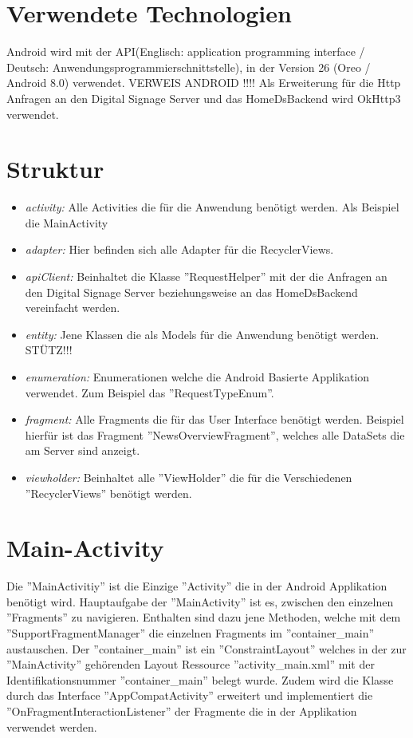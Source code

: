 \section{Verwendete Technologien}
Android wird mit der API(Englisch: application programming interface / Deutsch: Anwendungsprogrammierschnittstelle), in der Version 26 (Oreo / Android 8.0) verwendet. 
VERWEIS ANDROID !!!!
Als Erweiterung für die Http Anfragen an den Digital Signage Server und das HomeDsBackend wird OkHttp3 verwendet.

\section{Struktur}
\begin{itemize}
	\item {\em activity:} Alle Activities die für die Anwendung benötigt werden. Als Beispiel die MainActivity
	
	\item {\em adapter:} Hier befinden sich alle Adapter für die RecyclerViews.
	
	\item {\em apiClient:} Beinhaltet die Klasse ''RequestHelper'' mit der die Anfragen an den Digital Signage Server beziehungsweise an das HomeDsBackend vereinfacht werden.
	
	\item {\em entity:} Jene Klassen die als Models für die Anwendung benötigt werden. 
	STÜTZ!!!
	
	\item {\em enumeration:} Enumerationen welche die Android Basierte Applikation verwendet. Zum Beispiel das ''RequestTypeEnum''.
	
	\item {\em fragment:} Alle Fragments die für das User Interface benötigt werden. Beispiel hierfür ist das Fragment ''NewsOverviewFragment'', welches alle DataSets die am Server sind anzeigt.
	
	\item {\em viewholder:} Beinhaltet alle ''ViewHolder'' die für die Verschiedenen ''RecyclerViews'' benötigt werden. 
	  
		
\end{itemize}

\section{Main-Activity}
Die ''MainActivitiy'' ist die Einzige ''Activity'' die in der Android Applikation benötigt wird. Hauptaufgabe der ''MainActivity'' ist es, zwischen den einzelnen ''Fragments'' zu navigieren. Enthalten sind dazu jene Methoden, welche mit dem ''SupportFragmentManager'' die einzelnen Fragments im ''container\_main'' austauschen. Der ''container\_main'' ist ein ''ConstraintLayout'' welches in der zur ''MainActivity'' gehörenden Layout Ressource ''activity\_main.xml'' mit der Identifikationsnummer ''container\_main'' belegt wurde. Zudem wird die Klasse durch das Interface ''AppCompatActivity'' erweitert und implementiert die ''OnFragmentInteractionListener'' der Fragmente die in der Applikation verwendet werden.


